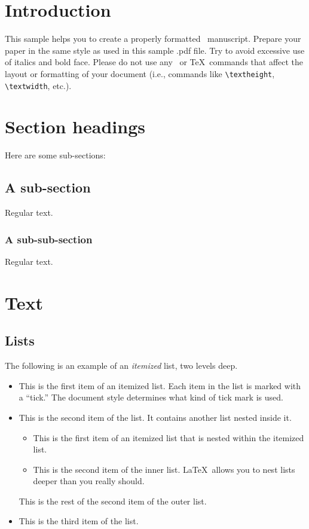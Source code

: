 \documentclass[ejsv2]{imsart}
\theoremstyle{plain}
\theoremstyle{definition}
\theoremstyle{remark}
\begin{document}
\section{Introduction}

This sample helps you to create a properly formatted \LaTeXe\ manuscript.
Prepare your paper in the same style as used in this sample .pdf file.
Try to avoid excessive use of italics and bold face.
Please do not use any \LaTeXe\ or \TeX\ commands that affect the layout
or formatting of your document (i.e., commands like \verb|\textheight|,
\verb|\textwidth|, etc.).

\section{Section headings}
Here are some sub-sections:
\subsection{A sub-section}
Regular text.
\subsubsection{A sub-sub-section}
Regular text.

\section{Text}
\subsection{Lists}

The following is an example of an \emph{itemized} list,
two levels deep.
\begin{itemize}
\item
This is the first item of an itemized list.  Each item
in the list is marked with a ``tick.''  The document
style determines what kind of tick mark is used.
\item
This is the second item of the list.  It contains another
list nested inside it.
\begin{itemize}
\item This is the first item of an itemized list that
is nested within the itemized list.
\item This is the second item of the inner list.  \LaTeX\
allows you to nest lists deeper than you really should.
\end{itemize}
This is the rest of the second item of the outer list.
\item
This is the third item of the list.
\end{itemize}
\end{document}
